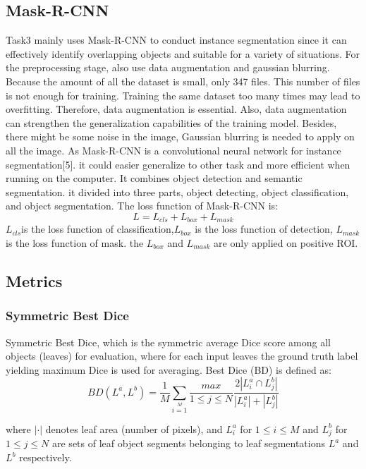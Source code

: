 \documentclass[conference]{IEEEtran}
\begin{document}
\subsection{Mask-R-CNN}
Task3 mainly uses Mask-R-CNN to conduct instance segmentation since it can effectively identify overlapping objects and suitable for a variety of situations. For the preprocessing stage, also use data augmentation and gaussian blurring. Because the amount of all the dataset is small, only 347 files. This number of files is not enough for training. Training the same dataset too many times may lead to overfitting. Therefore, data augmentation is essential. Also, data augmentation can strengthen the generalization capabilities of the training model. Besides, there might be some noise in the image, Gaussian blurring is needed to apply on all the image.
As Mask-R-CNN is a convolutional neural network for instance segmentation[5]. 
it could easier generalize to other task and more efficient when running on the computer.
It combines object detection and semantic segmentation. it divided into three parts, object detecting, object classification, and object segmentation.
The loss function of Mask-R-CNN is:
\begin{equation}
L= L_{cls}+L_{box}+L_{mask}
\end{equation}
$L_{cls}$is the loss function of classification,$L_{box}$ is the loss function of detection,  $L_{mask}$ is the loss function of mask.
the $L_{box}$ and $L_{mask}$ are only applied on positive ROI.

\subsection{Metrics}
\subsubsection{Symmetric Best Dice}
Symmetric Best Dice, which is the symmetric average Dice score among all objects (leaves) for evaluation, where for each input leaves the ground truth label yielding maximum Dice is used for averaging. Best Dice (BD) is defined as:
\begin{equation}
BD(L^{a},L^{b}) = \frac{1}{M} \sum\limits_{i=1}\limits^{M} \frac{max}{1\leq j \leq N} \frac {2|L^{a}_{i} \cap L_{j}^{b}|}{|L^{a}_{i}| + |L_{j}^{b}|}
\end{equation}

where $| \cdotp |$ denotes leaf area (number of pixels), and $L^{a}_{i}$ for $1 \leq i \leq M$ and $L^b_j$ for $1 \leq j \leq N$ are sets of leaf object segments belonging to leaf segmentations $L^a$ and $L^b$ respectively. 
\end{document}
